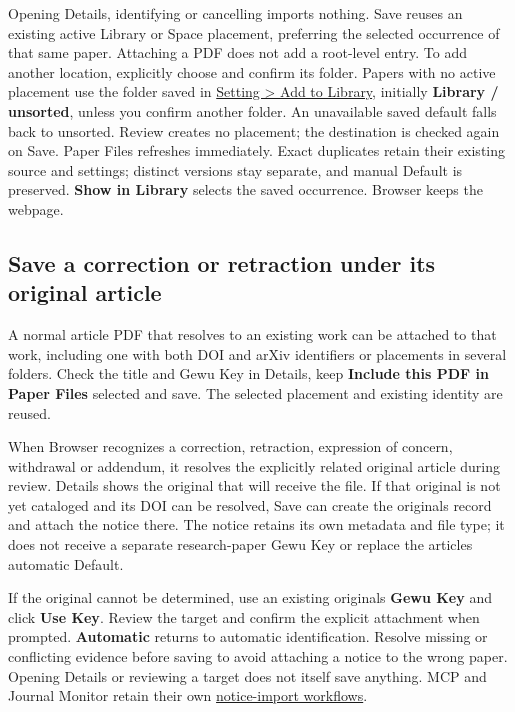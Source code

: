 \documentclass[10pt,letterpaper,oneside]{scrreprt}
\begin{document}
Opening Details, identifying or cancelling imports nothing. Save reuses an existing active Library or Space placement, preferring the selected occurrence of that same paper. Attaching a PDF does not add a root-level entry. To add another location, explicitly choose and confirm its folder. Papers with no active placement use the folder saved in \hyperref[add-to-library-settings]{Setting \textgreater{} Add to Library}, initially \textbf{Library / unsorted}, unless you confirm another folder. An unavailable saved default falls back to unsorted. Review creates no placement; the destination is checked again on Save. Paper Files refreshes immediately. Exact duplicates retain their existing source and settings; distinct versions stay separate, and manual Default is preserved. \textbf{Show in Library} selects the saved occurrence. Browser keeps the webpage.

\subsection{Save a correction or retraction under its original article}\label{browser-notice-save}

A normal article PDF that resolves to an existing work can be attached to that work, including one with both DOI and arXiv identifiers or placements in several folders. Check the title and Gewu Key in Details, keep \textbf{Include this PDF in Paper Files} selected and save. The selected placement and existing identity are reused.

When Browser recognizes a correction, retraction, expression of concern, withdrawal or addendum, it resolves the explicitly related original article during review. Details shows the original that will receive the file. If that original is not yet cataloged and its DOI can be resolved, Save can create the original\textquotesingle s record and attach the notice there. The notice retains its own metadata and file type; it does not receive a separate research-paper Gewu Key or replace the article\textquotesingle s automatic Default.

If the original cannot be determined, use an existing original\textquotesingle s \textbf{Gewu Key} and click \textbf{Use Key}. Review the target and confirm the explicit attachment when prompted. \textbf{Automatic} returns to automatic identification. Resolve missing or conflicting evidence before saving to avoid attaching a notice to the wrong paper. Opening Details or reviewing a target does not itself save anything. MCP and Journal Monitor retain their own \hyperref[monitor-publication-updates]{notice-import workflows}.
\end{document}
